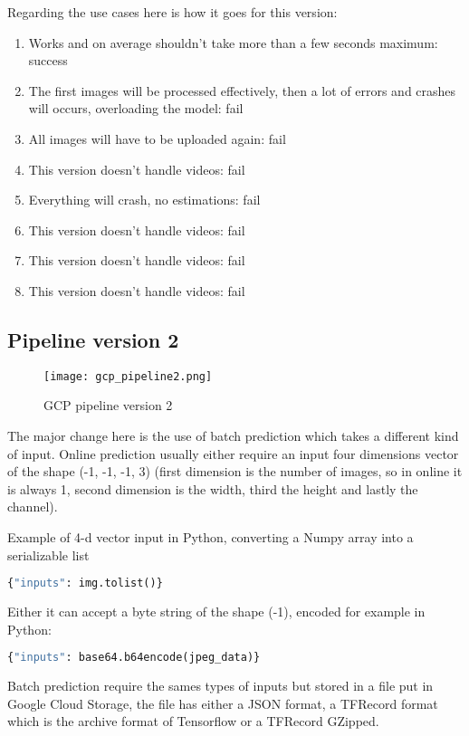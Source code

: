 Regarding the use cases here is how it goes for this version:
\begin{enumerate}
    \item Works and on average shouldn't take more than a few seconds maximum: success
    \item The first images will be processed effectively, then a lot of errors and crashes will occurs, overloading the model: fail
    \item All images will have to be uploaded again: fail
    \item This version doesn't handle videos: fail
    \item Everything will crash, no estimations: fail
    \item This version doesn't handle videos: fail
    \item This version doesn't handle videos: fail
    \item This version doesn't handle videos: fail
\end{enumerate}

\pagebreak\subsection{Pipeline version 2}
\begin{figure}[H]
    \centering %
    \texttt{[image: gcp\_pipeline2.png]}
	\caption{GCP pipeline version 2}
	\label{fig:pipelinev2}
\end{figure}

The major change here is the use of batch prediction which takes a different kind of input.
Online prediction usually either require an input four dimensions vector of the shape (-1, -1, -1, 3) (first dimension is the number of images, so in online it is always 1, second dimension is the width, third the height and lastly the channel).

Example of 4-d vector input in Python, converting a Numpy array into a serializable list
\begin{lstlisting}[language=Python]
{"inputs": img.tolist()}
\end{lstlisting}

Either it can accept a byte string of the shape (-1), encoded for example in Python:
\begin{lstlisting}[language=Python]
{"inputs": base64.b64encode(jpeg_data)}
\end{lstlisting}

\pagebreak
Batch prediction require the sames types of inputs but stored in a file put in Google Cloud Storage, the file has either a JSON format, a TFRecord format which is the archive format of Tensorflow or a TFRecord GZipped.

